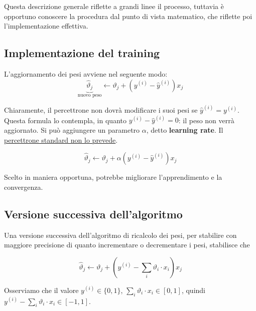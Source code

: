 Questa descrizione generale riflette a grandi linee il processo, tuttavia è opportuno conoscere la procedura dal punto di vista matematico, che riflette poi l'implementazione effettiva.

\subsection{Implementazione del training}
L'aggiornamento dei pesi avviene nel seguente modo:
$$
\underbrace{\hat{\vartheta}_j}_\text{nuovo peso}\leftarrow \vartheta_j + ( y^{(i)} -\hat{y}^{(i)})x_j
$$

Chiaramente, il percettrone non dovrà modificare i suoi pesi se $\hat{y}^{(i)} = y^{(i)}$. Questa formula lo contempla, in quanto $y^{(i)} - \hat{y}^{(i)} = 0$: il peso non verrà aggiornato. 
Si può aggiungere un parametro $\alpha$, detto \textbf{learning rate}. Il \underline{percettrone standard non lo prevede}.

$$
\hat{\vartheta}_j \leftarrow \vartheta_j + \alpha( y^{(i)} -\hat{y}^{(i)})x_j
$$

Scelto in maniera opportuna, potrebbe migliorare l'apprendimento e la convergenza.

\subsection{Versione successiva dell'algoritmo}

Una versione successiva dell'algoritmo di ricalcolo dei pesi, per stabilire con maggiore precisione di quanto incrementare o decrementare i pesi, stabilisce che

$$
\hat{\vartheta}_j \leftarrow \vartheta_j + \left( y^{(i)} - \sum_{i}\vartheta_i \cdot x_i\right)x_j
$$

Osserviamo che il valore $y^{(i)} \in \{0,1\}$, $\displaystyle\sum_{i}\vartheta_i \cdot x_i \in [0,1]$, quindi $y^{(i)} - \displaystyle\sum_{i}\vartheta_i \cdot x_i \in[-1,1]$.